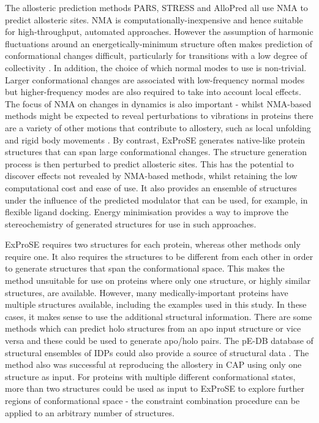 The allosteric prediction methods PARS, STRESS and AlloPred all use NMA to predict allosteric sites.
NMA is computationally-inexpensive and hence suitable for high-throughput, automated approaches.
However the assumption of harmonic fluctuations around an energetically-minimum structure often makes prediction of conformational changes difficult, particularly for transitions with a low degree of collectivity \cite{Yang2007}.
In addition, the choice of which normal modes to use is non-trivial.
Larger conformational changes are associated with low-frequency normal modes but higher-frequency modes are also required to take into account local effects.
The focus of NMA on changes in dynamics is also important - whilst NMA-based methods might be expected to reveal perturbations to vibrations in proteins there are a variety of other motions that contribute to allostery, such as local unfolding and rigid body movements \cite{Motlagh2014}.
By contrast, ExProSE generates native-like protein structures that can span large conformational changes.
The structure generation process is then perturbed to predict allosteric sites.
This has the potential to discover effects not revealed by NMA-based methods, whilst retaining the low computational cost and ease of use.
It also provides an ensemble of structures under the influence of the predicted modulator that can be used, for example, in flexible ligand docking.
Energy minimisation provides a way to improve the stereochemistry of generated structures for use in such approaches.

ExProSE requires two structures for each protein, whereas other methods only require one.
It also requires the structures to be different from each other in order to generate structures that span the conformational space.
This makes the method unsuitable for use on proteins where only one structure, or highly similar structures, are available.
However, many medically-important proteins have multiple structures available, including the examples used in this study.
In these cases, it makes sense to use the additional structural information.
There are some methods which can predict holo structures from an apo input structure or vice versa \cite{Seeliger2010, Grove2013, Kidd2009} and these could be used to generate apo/holo pairs.
The pE-DB database of structural ensembles of IDPs could also provide a source of structural data \cite{Varadi2014}.
The method also was successful at reproducing the allostery in CAP using only one structure as input.
For proteins with multiple different conformational states, more than two structures could be used as input to ExProSE to explore further regions of conformational space - the constraint combination procedure can be applied to an arbitrary number of structures.


